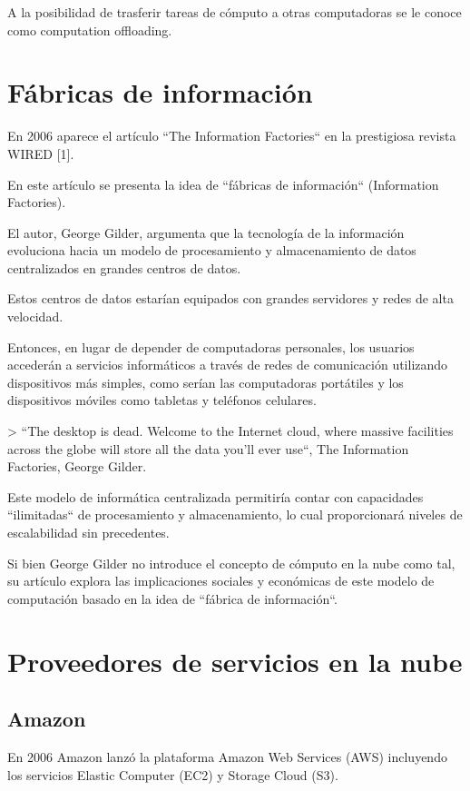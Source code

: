 A la posibilidad de trasferir tareas de cómputo a otras computadoras se le conoce como computation offloading.

\section{Fábricas de información}

En 2006 aparece el artículo ``The Information Factories`` en la prestigiosa revista WIRED [1].

En este artículo se presenta la idea de ``fábricas de información`` (Information Factories).

El autor, George Gilder, argumenta que la tecnología de la información evoluciona hacia un modelo de procesamiento y almacenamiento de datos centralizados en grandes centros de datos.

Estos centros de datos estarían equipados con grandes servidores y redes de alta velocidad.

Entonces, en lugar de depender de computadoras personales, los usuarios accederán a servicios informáticos a través de redes de comunicación utilizando dispositivos más simples, como serían las computadoras portátiles y los dispositivos móviles como tabletas y teléfonos celulares.

> ``The desktop is dead. Welcome to the Internet cloud, where massive facilities across the globe will store all the data you'll ever use``, The Information Factories, George Gilder.

Este modelo de informática centralizada permitiría contar con capacidades ``ilimitadas`` de procesamiento y almacenamiento, lo cual proporcionará niveles de escalabilidad sin precedentes.

Si bien George Gilder no introduce el concepto de cómputo en la nube como tal, su artículo explora las implicaciones sociales y económicas de este modelo de computación basado en la idea de ``fábrica de información``.

\section{Proveedores de servicios en la nube}

\subsection{Amazon}

En 2006 Amazon lanzó la plataforma Amazon Web Services (AWS) incluyendo los servicios Elastic Computer (EC2) y Storage Cloud (S3).

